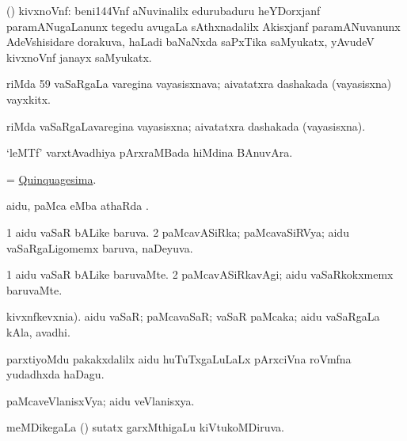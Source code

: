 \bentry
{}
\gl{\nA}
\bmng
(\ravi) kivxnoVnf: 
\banum
{} beni\char144Vnf aNuvinalilx edurubaduru heYDorxjanf paramANugaLanunx tegedu avugaLa sAthxnadalilx Akisxjanf paramANuvanunx AdeVshisidare dorakuva, haLadi baNaNxda saPxTika saMyukatx,  
 yAvudeV kivxnoVnf janayx saMyukatx. 
\eanum
\emng
\eentry

\bentry
{}
\gl{\nA}
\bmng
{}riMda {\rm 59} vaSaRgaLa varegina vayasisxnava; aivatatxra dashakada (vayasisxna) vayxkitx. 
\emng
\eentry

\bentry
{}
\gl{\gu}
\bmng
{}riMda  vaSaRgaLavaregina vayasisxna; aivatatxra dashakada (vayasisxna). 
\emng
\eentry

\bentry
{}
\gl{\nA}
\bmng
`leMTf' varxtAvadhiya pArxraMBada hiMdina BAnuvAra. 
\emng
\eentry

\bentry
{}
\gl{\nA}
\bmng
= \hyperlink{Quinquagesima}{Quinquagesima}. 
\emng
\eentry

\bentry
{}
\gl{\sapUpa}
\bmng
aidu, paMca eMba athaRda \sapUpa. 
\emng
\eentry

\bentry
{}
\gl{\gu}
\bmng
\bnum
\num{1} aidu vaSaR bALike baruva. 
\num{2} paMcavASiRka; paMcavaSiRVya; aidu vaSaRgaLigomemx baruva, naDeyuva. 
\enum
\emng
\eentry

\bentry
{}
\gl{\kirxvi}
\bmng
\bnum
\num{1} aidu vaSaR bALike baruvaMte. 
\num{2} paMcavASiRkavAgi; aidu vaSaRkokxmemx baruvaMte. 
\enum
\emng
\eentry

\bentry
{}
\gl{\nA}
kivxnfkevxnia).\bmng
aidu vaSaR; paMcavaSaR; vaSaR paMcaka; aidu vaSaRgaLa kAla, avadhi. 
\emng
\eentry

\bentry
{}
\gl{\nA}
\bmng
parxtiyoMdu pakakxdalilx aidu huTuTxgaLuLaLx pArxciVna roVmfna yudadhxda haDagu. 
\emng
\eentry

\bentry
{}
\gl{\gu}
\bmng
paMcaveVlanisxVya; aidu veVlanisxya. 
\emng
\eentry

\bentry
{}
\gl{\gu}
\bmng
meMDikegaLa () sutatx garxMthigaLu kiVtukoMDiruva. 
\emng
\eentry

